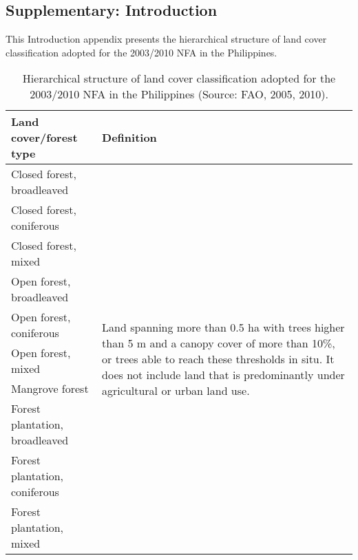 
\appendix

\begin{appendices}

\chapter{Supplementary: Introduction}
\label{sup: supplementary-intro}

This Introduction appendix presents the hierarchical structure of land cover classification adopted for the 2003/2010 NFA in the Philippines.
	\vspace*{10cm}


\begin{spacing}{1.0}
\begin{longtable}[h!]{ p{6cm} p{8cm} }

    \caption[LCCS hierarchical structure adopted for the 2003/2010 NFA in the Philippines.]{Hierarchical structure of land cover classification adopted for the 2003/2010 NFA in the Philippines (Source: FAO, 2005, 2010).}
    \label{tab: appendix-table.a1}\\
    
    \toprule
    Land cover/forest type & Definition \\
    \midrule
    \endhead

    Closed forest, broadleaved & \multirow{10}{8cm}[1cm]{Land spanning more than 0.5 ha with trees higher than 5 m and a canopy cover of more than 10\%, or trees able to reach these thresholds in situ. It does not include land that is predominantly under agricultural or urban land use.}\\
    Closed forest, coniferous & {}\\
    Closed forest, mixed & {}\\
    Open forest, broadleaved & {}\\
    Open forest, coniferous & {}\\
    Open forest, mixed & {}\\
    Mangrove forest & {}\\
    Forest plantation, broadleaved & {}\\
    Forest plantation, coniferous & {}\\
    Forest plantation, mixed & {}\\[3pt]
    

\end{longtable}
\end{spacing}
\end{appendices}
